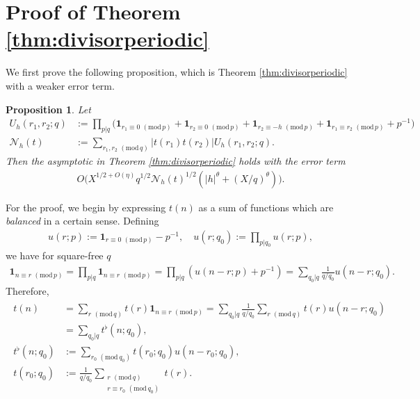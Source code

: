 \documentclass[12pt]{amsart}
\newtheorem{proposition}[theorem]{Proposition}
\theoremstyle{definition}
\theoremstyle{remark}
\numberwithin{equation}{section}
\newcommand{\1}{{\mathbf 1}}
\renewcommand{\pmod}[1]{\,\,(\mathrm{mod}\,{#1})}
\begin{document}
\section{Proof of Theorem \ref{thm:divisorperiodic}} \label{sec:proofapplperiodicdivisor}
We first prove the following proposition, which is Theorem \ref{thm:divisorperiodic} with a weaker error term.
\begin{proposition} \label{prop:divisorperiodicweak}
    Let
    \begin{align} \nonumber
U_h(r_1,r_2;q) &:=\prod_{p|q} \bigg( \mathbf{1}_{r_1\equiv 0 \pmod{p}} + \mathbf{1}_{r_2\equiv 0 \pmod{p}} + \mathbf{1}_{r_2\equiv -h \pmod{p}} + \mathbf{1}_{r_1 \equiv r_2 \pmod{p}} + p^{-1} \bigg) \\
   \label{eq:Ntdef} \mathcal{N}_h(t) &:= \sum_{r_1,r_2 \pmod{q}} |t(r_1) t(r_2)| U_h(r_1,r_2;q).
\end{align}
Then the asymptotic in Theorem \ref{thm:divisorperiodic} holds with the error term
\begin{align*}
    O\bigg( X^{1/2+O(\eta)} q^{1/2}\mathcal{N}_h(t)^{1/2}   (|h|^{\theta}+(X/q)^{\theta})  \bigg).
\end{align*}
\end{proposition}
For the proof, we begin by expressing $t(n)$ as a sum of functions which are \emph{balanced} in a certain sense. Defining
\begin{align} \label{def:urp}
    u(r;p) := \mathbf{1}_{r \equiv 0 \pmod{p}} - p^{-1}, \quad u(r;q_0) := \prod_{p|q_0}u(r;p),
    \end{align}
    we have for square-free $q$
    \begin{align*}
        \mathbf{1}_{n \equiv r \pmod{p}} = \prod_{p|q} \mathbf{1}_{n \equiv r \pmod{p}} =   \prod_{p|q} (u(n-r;p) + p^{-1}) = \sum_{q_0 | q}   \frac{1}{q/q_0}   u(n-r;q_0).
    \end{align*}
Therefore,
\begin{align} \label{eq:tsplitbalanced}
\begin{split}
      t(n) &= \sum_{r \pmod{q}} t(r)  \mathbf{1}_{n \equiv r \pmod{p}}  =  \sum_{q_0 | q}  \frac{1}{q/q_0}  \sum_{r \pmod{q}} t(r) u(n-r;q_0) \\
   & = \sum_{q_0 | q} t^{\flat}(n;q_0),
   \\
    t^{\flat}(n;q_0) &:= \sum_{r_0 \pmod{q_0}} t(r_0;q_0) u(n-r_0;q_0), \\
    t(r_0;q_0)  &:= \frac{1}{q/q_0}\sum_{\substack{r \pmod{q} \\ r \equiv r_0 \pmod{q_0}}} t(r).  
\end{split}
\end{align}
\end{document}
